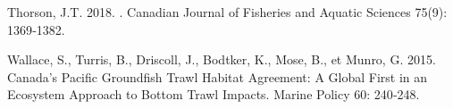 \documentclass[12pt]{article}\usepackage[]{graphicx}\usepackage[]{color}
\begin{document}
\begin{CSLReferences}{1}{0}
Thorson, J.T. 2018. . Canadian Journal of Fisheries and Aquatic Sciences 75(9): 1369‑1382.

Wallace, S., Turris, B., Driscoll, J., Bodtker, K., Mose, B., et Munro, G. 2015. Canada's {Pacific} Groundfish Trawl Habitat Agreement: {A} Global First in an Ecosystem Approach to Bottom Trawl Impacts. Marine Policy 60: 240‑248.

\end{CSLReferences}
\end{document}
